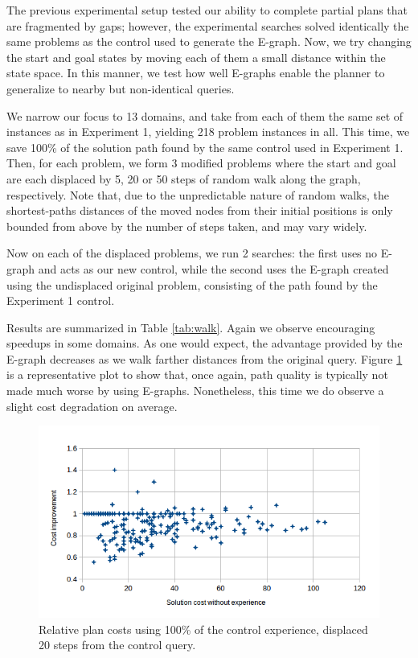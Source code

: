 \documentclass[letterpaper]{article}
\begin{document}
The previous experimental setup tested our ability to complete partial plans that are fragmented by gaps; however, the experimental searches solved identically the same problems as the control used to generate the E-graph.
Now, we try changing the start and goal states by moving each of them a small distance within the state space. 
In this manner, we test how well E-graphs enable the planner to generalize to nearby but non-identical queries.

We narrow our focus to 13 domains, and take from each of them the same set of instances as in Experiment 1, yielding 218 problem instances in all.
This time, we save 100\% of the solution path found by the same control used in Experiment 1.
Then, for each problem, we form 3 modified problems where the start and goal are each displaced by 5, 20 or 50 steps of random walk along the graph, respectively.
Note that, due to the unpredictable nature of random walks, the shortest-paths distances of the moved nodes from their initial positions is only bounded from above by the number of steps taken, and may vary widely.

Now on each of the displaced problems, we run 2 searches: the first uses no E-graph and acts as our new control, while the second uses the E-graph created using the undisplaced original problem, consisting of the path found by the Experiment 1 control.

Results are summarized in Table \ref{tab:walk}.
Again we observe encouraging speedups in some domains. As one would expect, the advantage provided by the E-graph decreases as we walk farther distances from the original query. Figure \ref{fig:c_100_20} is a representative plot to show that, once again, path quality is typically not made much worse by using E-graphs. Nonetheless, this time we do observe a slight cost degradation on average.

\begin{figure}
	\centering
	\includegraphics[scale=0.5]{Cost_100_20.png}
	\caption{Relative plan costs using 100\% of the control experience, displaced 20 steps from the control query.}
	 \label{fig:c_100_20}
\end{figure}
\end{document}
